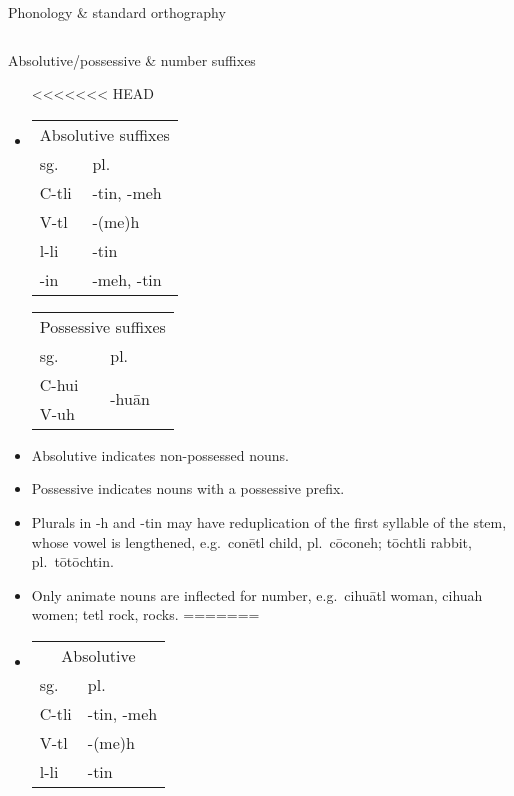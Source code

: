 \documentclass[12pt]{beamer}
\newcommand{\nah}[1]{\textcolor{nahgrn}{#1}}
\newcommand{\trs}[1]{\textcolor{nahblu}{#1}}
\begin{document}
\begin{frame}
\begin{columns}[t]
\begin{column}{.22\linewidth}
\begin{block}{Phonology \& standard orthography}
\begin{threeparttable}
\begin{tablenotes}
\begin{frame}
\begin{columns}[t]
\begin{column}{.23\linewidth}
      \begin{block}{Absolutive/possessive \& number suffixes}
        \begin{itemize}
<<<<<<< HEAD
        \item
          \begin{tabular}[t]{ll}
            \multicolumn{2}{c}{Absolutive suffixes} \\
            sg.   & pl. \\
            \nah{C-tli} & \nah{-tin, -meh} \\
            \nah{V-tl}  & \nah{-(me)h} \\
            \nah{l-li}  & \nah{-tin} \\
            \nah{-in}   & \nah{-meh, -tin} \\
          \end{tabular}%
          \qquad
          \begin{tabular}[t]{ll}
            \multicolumn{2}{c}{Possessive suffixes} \\
            sg.   & pl. \\
            \nah{C-hui} & \multicolumn{1}{l}{\multirow{2}[0]{*}{\nah{-huān}}} \\
            \nah{V-uh}  &  \\
          \end{tabular}%
        \item Absolutive indicates non-possessed nouns.
        \item Possessive indicates nouns with a possessive prefix.
        \item Plurals in \nah{-h} and \nah{-tin} may have reduplication of the first syllable of the stem, whose vowel is lengthened, e.g.~\nah{conētl} \trs{child}, pl.~\nah{cōconeh}; \nah{tōchtli} \trs{rabbit}, pl.~\nah{tōtōchtin}.
        \item Only animate nouns are inflected for number, e.g.~\nah{cihuātl} \trs{woman}, \nah{cihuah} \trs{women}; \nah{tetl} \trs{rock, rocks}. 
=======
          \item
                \begin{tabular}[t]{ll}
                  \multicolumn{2}{c}{Absolutive} \\
                  sg.         & pl.              \\
                  \nah{C-tli} & \nah{-tin, -meh} \\
                  \nah{V-tl}  & \nah{-(me)h}     \\
                  \nah{l-li}  & \nah{-tin}       \\

\end{tabular}
\end{itemize}
\end{block}
\end{column}
\end{columns}
\end{frame}
\end{tablenotes}
\end{threeparttable}
\end{block}
\end{column}
\end{columns}
\end{frame}
\end{document}
